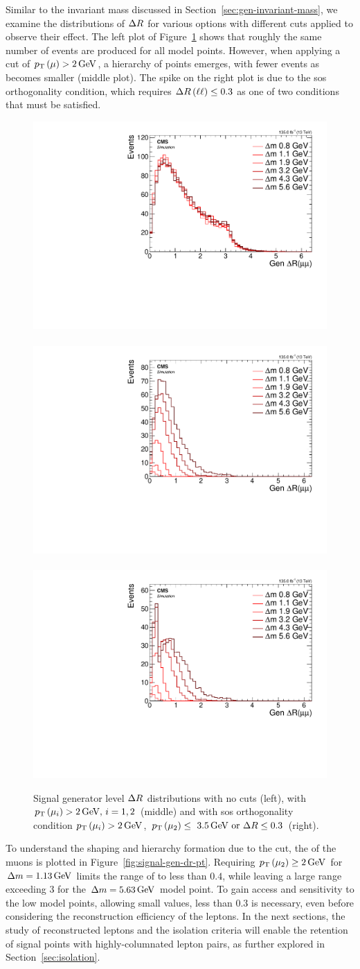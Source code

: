 Similar to the invariant mass discussed in Section~\ref{sec:gen-invariant-mass}, we examine the distributions of $\Delta R$ for various \dm options with different cuts applied to observe their effect. The left plot of Figure~\ref{fig:signal-generator-dr} shows that roughly the same number of events are produced for all \dm model points. However, when applying a cut of $p_{\mathrm{T}}\left(\mu\right)>2\,\text{Ge\hspace{-.08em}V}$, a hierarchy of \dm points emerges, with fewer events as \dm becomes smaller (middle plot). The spike on the right plot is due to the \gls{sos} orthogonality condition, which requires $\Delta R\left(\ell\ell\right)\leq 0.3$ as one of two conditions that must be satisfied.

\begin{figure}[!htb]
\centering
\includegraphics[width=0.32\linewidth]{plots/signal_muons_gen/none_gen_deltaR.pdf} \,
\includegraphics[width=0.32\linewidth]{plots/signal_muons_gen/none_gen_deltaR_cut.pdf}  \,
\includegraphics[width=0.32\linewidth]{plots/signal_muons_gen/none_gen_deltaR_orth.pdf} \\
\caption[Signal generator level \DR distributions]{ Signal generator level $\Delta R$ distributions with no cuts (left), with $p_{\mathrm{T}}\left(\mu_i\right)>2\,\text{Ge\hspace{-.08em}V},\,i=1,2$ (middle) and with \gls{sos} orthogonality condition $p_{\mathrm{T}}\left(\mu_i\right)>2\,\text{Ge\hspace{-.08em}V}$, $p_{\mathrm{T}}\left(\mu_2\right)\leq~3.5\,\text{Ge\hspace{-.08em}V}\text{ or }\Delta R\leq 0.3$ (right).}
\label{fig:signal-generator-dr}
\end{figure}

To understand the shaping and hierarchy formation due to the \pt cut, the \pt of the muons is plotted \vs \drll in Figure~\ref{fig:signal-gen-dr-pt}. Requiring $p_{\mathrm{T}}\left(\mu_2\right)\geq 2\,\text{Ge\hspace{-.08em}V}$ for $\Delta m=1.13\,\text{Ge\hspace{-.08em}V}$ limits the range of \drmm to less than $0.4$, while leaving a large range exceeding 3 for the $\Delta m=5.63\,\text{Ge\hspace{-.08em}V}$ model point. To gain access and sensitivity to the low \dm model points, allowing small \drll values, less than 0.3 is necessary, even before considering the reconstruction efficiency of the leptons. In the next sections, the study of reconstructed leptons and the isolation criteria will enable the retention of signal points with highly-columnated lepton pairs, as further explored in Section~\ref{sec:isolation}.


